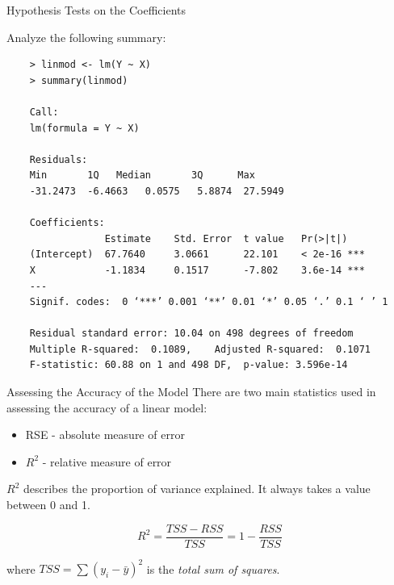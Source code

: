 \begin{frame}[fragile]{Hypothesis Tests on the Coefficients}

    Analyze the following summary:

    {\tiny\begin{verbatim}
    > linmod <- lm(Y ~ X)
    > summary(linmod)
    
    Call:
    lm(formula = Y ~ X)
    
    Residuals:
    Min       1Q   Median       3Q      Max 
    -31.2473  -6.4663   0.0575   5.8874  27.5949 
    
    Coefficients:
                 Estimate    Std. Error  t value   Pr(>|t|)    
    (Intercept)  67.7640     3.0661      22.101    < 2e-16 ***
    X            -1.1834     0.1517      -7.802    3.6e-14 ***
    ---
    Signif. codes:  0 ‘***’ 0.001 ‘**’ 0.01 ‘*’ 0.05 ‘.’ 0.1 ‘ ’ 1
    
    Residual standard error: 10.04 on 498 degrees of freedom
    Multiple R-squared:  0.1089,	Adjusted R-squared:  0.1071 
    F-statistic: 60.88 on 1 and 498 DF,  p-value: 3.596e-14
    \end{verbatim}}

\end{frame}

\begin{frame}{Assessing the Accuracy of the Model}
    There are two main statistics used in assessing the accuracy of a linear model:
    \begin{itemize}
        \item RSE - absolute measure of error
        \item $R^2$ - relative measure of error
    \end{itemize}

    $R^2$ describes the proportion of variance explained. It always takes a value between 0 and 1.

    \begin{equation}
    R^2 = \frac{TSS - RSS}{TSS} = 1 - \frac{RSS}{TSS}
    \end{equation}
    
    where $TSS = \sum(y_i - \bar{y})^2$ is the \emph{total sum of squares}.

\end{frame}

